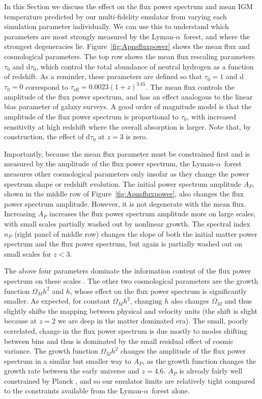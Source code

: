 \documentclass[a4paper,11pt]{article}
\newcommand{\Lya}{Lyman-$\alpha$}
\begin{document}
In this Section we discuss the effect on the flux power spectrum and mean IGM temperature predicted by our multi-fidelity emulator from varying each simulation parameter individually. We can use this to understand which parameters are most strongly measured by the \Lya~forest, and where the strongest degeneracies lie. Figure~\ref{fig:Apnsfluxpower} shows the mean flux and cosmological parameters. The top row shows the mean flux rescaling parameters $\tau_0$ and d$\tau_0$, which control the total abundance of neutral hydrogen as a function of redshift. As a reminder, these parameters are defined so that  $\tau_0 = 1$ and d$\tau_0 = 0$ correspond to $\tau_\mathrm{eff} = 0.0023 (1+z)^{3.65}$. The mean flux controls the amplitude of the flux power spectrum, and has an effect analogous to the linear bias parameter of galaxy surveys. A good order of magnitude model is that the amplitude of the flux power spectrum is proportional to $\tau_0$, with increased sensitivity at high redshift where the overall absorption is larger. Note that, by construction, the effect of d$\tau_0$ at $z=3$ is zero.

Importantly, because the mean flux parameter must be constrained first and is measured by the amplitude of the flux power spectrum, the \Lya~forest measures other cosmological parameters only insofar as they change the power spectrum shape or redshift evolution. The initial power spectrum  amplitude $A_P$, shown in the middle row of Figure~\ref{fig:Apnsfluxpower}, also changes the flux power spectrum amplitude. However, it is not degenerate with the mean flux. Increasing $A_P$ increases the flux power spectrum amplitude more on large scales, with small scales partially washed out by nonlinear growth. The spectral index $n_P$ (right panel of middle row) changes the slope of both the initial matter power spectrum and the flux power spectrum, but again is partially washed out on small scales for $z < 3$.

The above four parameters dominate the information content of the flux power spectrum on these scales \cite{Pedersen:2022}. The other two cosmological parameters are the growth function $\Omega_M h^2$ and $h$, whose effect on the flux power spectrum is significantly smaller. As expected, for constant $\Omega_M h^2$, changing $h$ also changes $\Omega_M$ and thus slightly shifts the mapping between physical and velocity units (the shift is slight because at $z=2$ we are deep in the matter dominated era). The small, poorly correlated, change in the flux power spectrum is due mostly to modes shifting between bins and thus is dominated by the small residual effect of cosmic variance. The growth function $\Omega_M h^2$ changes the amplitude of the flux power spectrum in a similar but smaller way to $A_P$, as the growth function changes the growth rate between the early universe and $z = 4.6$. $A_P$ is already fairly well constrained by Planck \cite{Planck:2018}, and so our emulator limits are relatively tight compared to the constraints available from the \Lya~forest alone.
\end{document}
